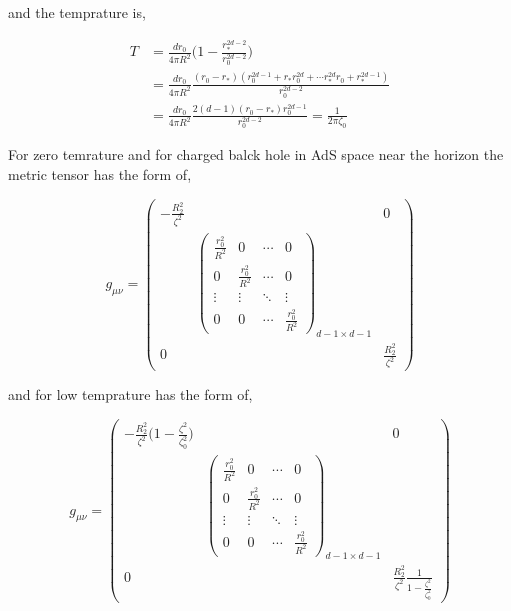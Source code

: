 and the temprature is,

\begin{align}
    T &= \frac{dr_0}{4\pi R^2}\bigg(1-\frac{r_*^{2d-2}}{r_0^{2d-2}}\bigg) \\
      &= \frac{dr_0}{4\pi R^2}\frac{(r_0 - r_*)(r_0^{2d-1} + r_*r_0^{2d} + \cdots r_*^{2d}r_0 + r_*^{2d-1})}{r_0^{2d-2}} \nonumber\\
      &= \frac{dr_0}{4\pi R^2}\frac{2(d-1)(r_0 - r_*)r_0^{2d-1}}{r_0^{2d-2}} = \frac{1}{2\pi\zeta_0} \nonumber
\end{align}

For zero temrature and for charged balck hole in AdS space near the horizon the metric tensor has the form of,

\begin{equation} \label{eq:ChargedBlackHoleAdSZeroT_metrictensor}
    g_{\mu\nu} = 
    \begin{pmatrix}
        -\frac{R^2_2}{\zeta^2} & & 0 \\
        & \begin{pmatrix}
            \frac{r^2_0}{R^2} & 0 & \cdots & 0 \\
            0 & \frac{r^2_0}{R^2} & \cdots & 0 \\
            \vdots  & \vdots  & \ddots & \vdots  \\
            0 & 0 & \cdots & \frac{r^2_0}{R^2}
        \end{pmatrix}_{d-1 \times d-1}
        &\\
        0 & & \frac{R^2_2}{\zeta^2} 
    \end{pmatrix}
\end{equation}

and for low temprature has the form of,

\begin{equation} \label{eq:ChargedBlackHoleAdSLowT_metrictensor}
    g_{\mu\nu} = 
    \begin{pmatrix}
        -\frac{R^2_2}{\zeta^2}\big(1-\frac{\zeta^2}{\zeta^2_0}\big) & & 0 \\
        & \begin{pmatrix}
            \frac{r^2_0}{R^2} & 0 & \cdots & 0 \\
            0 & \frac{r^2_0}{R^2} & \cdots & 0 \\
            \vdots  & \vdots  & \ddots & \vdots  \\
            0 & 0 & \cdots & \frac{r^2_0}{R^2}
        \end{pmatrix}_{d-1 \times d-1}
        &\\
        0 & & \frac{R^2_2}{\zeta^2}\frac{1}{1-\frac{\zeta^2}{\zeta^2_0}} 
    \end{pmatrix}
\end{equation}

